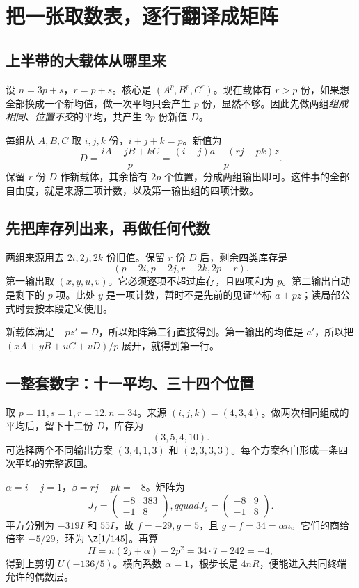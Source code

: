 \chapter{把一张取数表，逐行翻译成矩阵}\label{app:upper}
\section{上半带的大载体从哪里来}
设 $n=3p+s$，$r=p+s$。核心是 $(A^p,B^p,C^r)$。现在载体有 $r>p$ 份，如果想全部换成一个新均值，做一次平均只会产生 $p$ 份，显然不够。因此先做两组\emph{组成相同、位置不交}的平均，共产生 $2p$ 份新值 $D$。

每组从 $A,B,C$ 取 $i,j,k$ 份，$i+j+k=p$。新值为
\[D=\frac{iA+jB+kC}{p}
=\frac{(i-j)a+(rj-pk)z}{p}.
\]
保留 $r$ 份 $D$ 作新载体，其余恰有 $2p$ 个位置，分成两组输出即可。这件事的全部自由度，就是来源三项计数，以及第一输出组的四项计数。

\section{先把库存列出来，再做任何代数}
两组来源用去 $2i,2j,2k$ 份旧值。保留 $r$ 份 $D$ 后，剩余四类库存是
\[(p-2i, p-2j, r-2k, 2p-r).
\]
第一输出取 $(x,y,u,v)$。它必须逐项不超过库存，且四项和为 $p$。第二输出自动是剩下的 $p$ 项。此处 $y$ 是一项计数，暂时不是先前的见证坐标 $a+pz$；读局部公式时要按本段定义使用。

新载体满足 $-pz'=D$，所以矩阵第二行直接得到。第一输出的均值是 $a'$，所以把 $(xA+yB+uC+vD)/p$ 展开，就得到第一行。

\section{一整套数字：十一平均、三十四个位置}
取 $p=11,s=1,r=12,n=34$。来源 $(i,j,k)=(4,3,4)$。做两次相同组成的平均后，留下十二份 $D$，库存为
\[(3,5,4,10).
\]
可选择两个不同输出方案 $(3,4,1,3)$ 和 $(2,3,3,3)$。每个方案各自形成一条四次平均的完整返回。

$\alpha=i-j=1$，$\beta=rj-pk=-8$。矩阵为
\[
J_f=\begin{pmatrix}-8&383\\-1&8\end{pmatrix},qquad
J_g=\begin{pmatrix}-8&9\\-1&8\end{pmatrix}.
\]
平方分别为 $-319I$ 和 $55I$，故 $f=-29,g=5$，且 $g-f=34=\alpha n$。它们的商给倍率 $-5/29$，环为 $\Z[1/145]$。再算
\[H=n(2j+\alpha)-2p^2=34\cdot7-242=-4,
\]
得到上剪切 $U(-136/5)$。横向系数 $\alpha=1$，根步长是 $4nR$，便能进入共同终端允许的偶数层。

